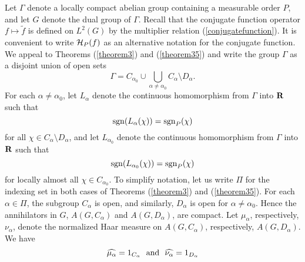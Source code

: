  Let $\Gamma$ denote a locally
compact abelian group containing a measurable 
order $P$, and let $G$ denote the 
dual group of $\Gamma$.  
Recall that the conjugate function operator
$f\mapsto \widetilde{f}$ is defined on 
$L^2(G)$ by the multiplier relation 
(\ref{conjugatefunction}).  It is convenient to 
write ${\cal H}_P (f)$ as  an alternative notation for the
conjugate function. We appeal to Theorems (\ref{theorem3}) 
and (\ref{theorem35}) and write the group $\Gamma$ as a 
disjoint union of open sets
\begin{equation}
\Gamma=C_{\alpha_0}\cup \bigcup_{\alpha\neq \alpha_0}
 C_\alpha\setminus D_\alpha.
\label{decomposition-of-gamma}
\end{equation}
For each $\alpha \neq \alpha_0$,
let $L_\alpha$ denote the continuous homomorphism
from $\Gamma$ into $\R$ such that 
\begin{equation}
{\rm sgn} (L_\alpha (\chi))={\rm sgn}_P(\chi)
\label{separating-L}
\end{equation}
for all $\chi \in C_\alpha\setminus D_\alpha$, and let
$L_{\alpha_0}$ denote the continuous homomorphism
from $\Gamma$ into $\R$ such that 
\begin{equation}
{\rm sgn} (L_{\alpha_0} (\chi))={\rm sgn}_P(\chi)
\label{separating-L0}
\end{equation}
for locally almost all $\chi \in C_{\alpha_0}$.
To simplify notation, let us write 
$\Pi$ for the indexing set in both
cases of Theorems (\ref{theorem3}) and (\ref{theorem35}).
For each $\alpha\in \Pi$, the subgroup $C_\alpha$
is open, and similarly, $D_\alpha$ is
 open for $\alpha\neq \alpha_0$.  Hence the annihilators
in $G$,
$A(G,C_\alpha)$ and $A(G,D_\alpha)$,
are compact.  Let $\mu_\alpha$, respectively,
$\nu_\alpha$, denote the normalized Haar measure on
$A(G,C_\alpha)$, respectively, $A(G,D_\alpha)$.
We have
\begin{equation}
\widehat{\mu_\alpha}=1_{C_\alpha}\ \ {\rm and}\ \ 
\widehat{\nu_\alpha}=1_{D_\alpha}
\label{fourier-transform-of-mu-and-nu}
\end{equation}
